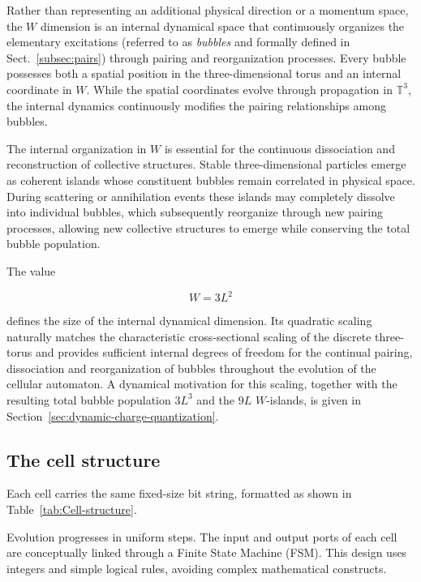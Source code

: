 \documentclass{ijuc}
\begin{document}
Rather than representing an additional physical direction or a momentum space, the \(W\) dimension is an internal dynamical space that
 continuously organizes the elementary excitations (referred to as \emph{bubbles} and formally defined in Sect.~\ref{subsec:pairs}) through pairing and reorganization processes. Every bubble possesses both a spatial 
 position in the three-dimensional torus and an internal coordinate in \(W\). While the spatial coordinates evolve through propagation 
 in \(\mathbb{T}^3\), the internal dynamics continuously modifies the pairing relationships among bubbles.

The internal organization in \(W\) is essential for the continuous dissociation and reconstruction of collective structures. Stable 
three-dimensional particles emerge as coherent islands whose constituent bubbles remain correlated in physical space. During scattering or annihilation events these islands may completely dissolve into individual bubbles, which 
subsequently reorganize through new pairing processes, allowing new collective structures to emerge while conserving the total bubble 
population.

The value

\[
W=3L^2
\]

defines the size of the internal dynamical dimension. Its quadratic scaling naturally matches the characteristic cross-sectional 
scaling of the discrete three-torus and provides sufficient internal degrees of freedom for the continual pairing, dissociation and 
reorganization of bubbles throughout the evolution of the cellular automaton. A dynamical motivation for this scaling, together with the resulting total bubble population $3L^3$ and the $9L$ $W$-islands, is given in Section~\ref{sec:dynamic-charge-quantization}.

\subsection{The cell structure \label{subsec:The-cell-structure}}

Each cell carries the same fixed-size bit string, formatted as shown in Table~\ref{tab:Cell-structure}.

Evolution progresses in uniform steps. 
The input and output ports of each cell are conceptually linked through a Finite State Machine (FSM). 
This design uses integers and simple logical rules, avoiding complex mathematical constructs.
\end{document}
